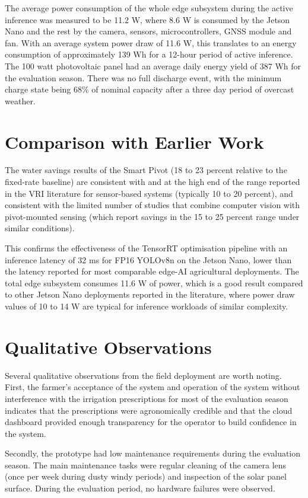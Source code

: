 \documentclass[12pt,a4paper]{report}
\begin{document}
The average power consumption of the whole edge subsystem during the active inference was measured to be 11.2 W, where 8.6 W is consumed by the Jetson Nano and the rest by the camera, sensors, microcontrollers, GNSS module and fan. With an average system power draw of 11.6 W, this translates to an energy consumption of approximately 139 Wh for a 12-hour period of active inference. The 100 watt photovoltaic panel had an average daily energy yield of 387 Wh for the evaluation season. There was no full discharge event, with the minimum charge state being 68\% of nominal capacity after a three day period of overcast weather.

\section{Comparison with Earlier Work}

The water savings results of the Smart Pivot (18 to 23 percent relative to the fixed-rate baseline) are consistent with and at the high end of the range reported in the VRI literature for sensor-based systems (typically 10 to 20 percent), and consistent with the limited number of studies that combine computer vision with pivot-mounted sensing (which report savings in the 15 to 25 percent range under similar conditions).

This confirms the effectiveness of the TensorRT optimisation pipeline with an inference latency of 32 ms for FP16 YOLOv8n on the Jetson Nano, lower than the latency reported for most comparable edge-AI agricultural deployments. The total edge subsystem consumes 11.6 W of power, which is a good result compared to other Jetson Nano deployments reported in the literature, where power draw values of 10 to 14 W are typical for inference workloads of similar complexity.

\section{Qualitative Observations}

Several qualitative observations from the field deployment are worth noting. First, the farmer's acceptance of the system and operation of the system without interference with the irrigation prescriptions for most of the evaluation season indicates that the prescriptions were agronomically credible and that the cloud dashboard provided enough transparency for the operator to build confidence in the system.

Secondly, the prototype had low maintenance requirements during the evaluation season. The main maintenance tasks were regular cleaning of the camera lens (once per week during dusty windy periods) and inspection of the solar panel surface. During the evaluation period, no hardware failures were observed.
\end{document}
